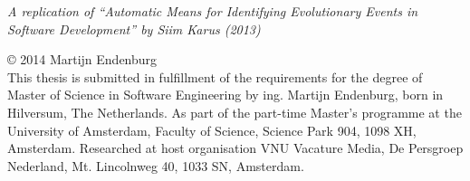 \null
\vspace{10em}

\begin{center}
	\emph{A replication of ``Automatic Means for Identifying Evolutionary Events
	in Software Development'' by Siim Karus (2013)}\rm
\end{center}

\vfill

\noindent\copyright{ 2014} Martijn Endenburg\\[0.3cm]
This thesis is submitted in fulfillment of the requirements for the degree of
Master of Science in Software Engineering by ing. Martijn Endenburg, born in
Hilversum, The Netherlands. As part of the part-time Master's programme at the
University of Amsterdam, Faculty of Science, Science Park 904, 1098 XH,
Amsterdam. Researched at host organisation VNU Vacature Media, De Persgroep
Nederland, Mt. Lincolnweg 40, 1033 SN, Amsterdam.
